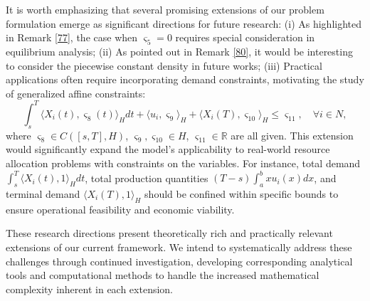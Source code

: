 \documentclass[10pt]{article}
\begin{document}
It is worth emphasizing that several promising extensions of our problem formulation emerge as significant directions for future research: (i) As highlighted in Remark \ref{77}, the case when $\varsigma_5=0$ requires special consideration in equilibrium analysis;  (ii) As pointed out in Remark \ref{80}, it would be interesting to consider the piecewise constant density in future works; (iii) Practical applications often require incorporating demand constraints, motivating the study of generalized affine constraints:
$$
\int_s^T\langle X_i(t),\varsigma_8(t)\rangle_Hdt+\langle u_i,\varsigma_9\rangle_H+\langle X_i(T),\varsigma_{10}\rangle_H\leq\varsigma_{11}, \quad\forall i\in N,
$$
where $\varsigma_8\in C([s,T],H)$, $\varsigma_9,\varsigma_{10}\in H$, $\varsigma_{11}\in \mathbb{R}$ are all given.  This extension would significantly expand the model's applicability to real-world resource allocation problems with constraints on  the variables. For instance,   total demand $\int_s^T\langle X_i(t),1\rangle_Hdt$,   total production quantities $(T-s)\int_a^b xu_i(x)dx$, and  terminal demand $\langle X_i(T),1\rangle_H$ should be confined within specific bounds to ensure operational feasibility and economic viability.

These research directions present theoretically rich and practically relevant extensions of our current framework. We intend to systematically address these challenges through continued investigation, developing corresponding analytical tools and computational methods to handle the increased mathematical complexity inherent in each extension.






\end{document}

